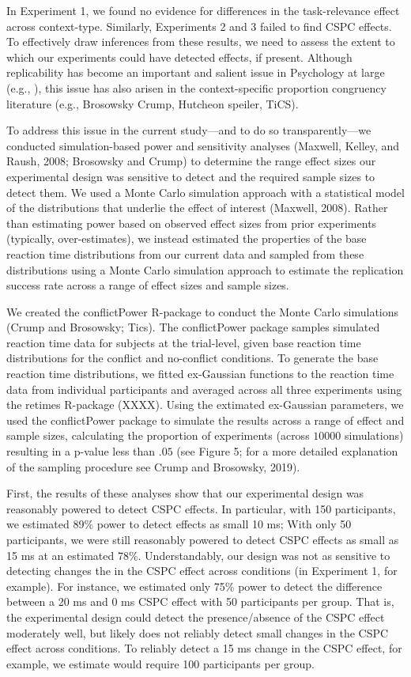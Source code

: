 \documentclass[english,,man,floatsintext]{apa6}
\begin{document}
In Experiment 1, we found no evidence for differences in the task-relevance effect across context-type. Similarly, Experiments 2 and 3 failed to find CSPC effects. To effectively draw inferences from these results, we need to assess the extent to which our experiments could have detected effects, if present. Although replicability has become an important and salient issue in Psychology at large (e.g., ), this issue has also arisen in the context-specific proportion congruency literature (e.g., Brosowsky Crump, Hutcheon speiler, TiCS).

To address this issue in the current study---and to do so transparently---we conducted simulation-based power and sensitivity analyses (Maxwell, Kelley, and Raush, 2008; Brosowsky and Crump) to determine the range effect sizes our experimental design was sensitive to detect and the required sample sizes to detect them. We used a Monte Carlo simulation approach with a statistical model of the distributions that underlie the effect of interest (Maxwell, 2008). Rather than estimating power based on observed effect sizes from prior experiments (typically, over-estimates), we instead estimated the properties of the base reaction time distributions from our current data and sampled from these distributions using a Monte Carlo simulation approach to estimate the replication success rate across a range of effect sizes and sample sizes.

We created the conflictPower R-package to conduct the Monte Carlo simulations (Crump and Brosowsky; Tics). The conflictPower package samples simulated reaction time data for subjects at the trial-level, given base reaction time distributions for the conflict and no-conflict conditions. To generate the base reaction time distributions, we fitted ex-Gaussian functions to the reaction time data from individual participants and averaged across all three experiments using the retimes R-package (XXXX). Using the extimated ex-Gaussian parameters, we used the conflictPower package to simulate the results across a range of effect and sample sizes, calculating the proportion of experiments (across \(10 000\) simulations) resulting in a p-value less than \(.05\) (see Figure 5; for a more detailed explanation of the sampling procedure see Crump and Brosowsky, 2019).

First, the results of these analyses show that our experimental design was reasonably powered to detect CSPC effects. In particular, with 150 participants, we estimated 89\% power to detect effects as small 10 ms; With only 50 participants, we were still reasonably powered to detect CSPC effects as small as 15 ms at an estimated 78\%. Understandably, our design was not as sensitive to detecting changes the in the CSPC effect across conditions (in Experiment 1, for example). For instance, we estimated only 75\% power to detect the difference between a 20 ms and 0 ms CSPC effect with 50 participants per group. That is, the experimental design could detect the presence/absence of the CSPC effect moderately well, but likely does not reliably detect small changes in the CSPC effect across conditions. To reliably detect a 15 ms change in the CSPC effect, for example, we estimate would require 100 participants per group.
\end{document}
